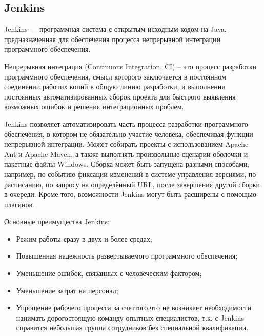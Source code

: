 \documentclass[a4paper]{article}
\begin{document}
    \subsection{Jenkins}
    Jenkins — программная система с открытым исходным кодом на Java, предназначенная для обеспечения процесса непрерывной интеграции программного обеспечения. \par
    Непрерывная интеграция (Continuous Integration, CI) – это процесс разработки программного обеспечения, смысл которого заключается в постоянном соединении рабочих копий в общую линию разработки, и выполнении постоянных автоматизированных сборок проекта для быстрого выявления возможных ошибок и решения интеграционных проблем. \par
    Jenkins позволяет автоматизировать часть процесса разработки программного обеспечения, в котором не обязательно участие человека, обеспечивая функции непрерывной интеграции. Может собирать проекты с использованием Apache Ant и Apache Maven, а также выполнять произвольные сценарии оболочки и пакетные файлы Windows. Сборка может быть запущена разными способами, например, по событию фиксации изменений в системе управления версиями, по расписанию, по запросу на определённый URL, после завершения другой сборки в очереди. Кроме того, возможности Jenkins могут быть расширены с помощью плагинов. \par
    Основные преимущества Jenkins:
    \begin{itemize}
        \item Режим работы сразу в двух и более средах;
        \item Повышенная надежность развертываемого программного обеспечения;
        \item Уменьшение ошибок, связанных с человеческим фактором;
        \item Уменьшение затрат на персонал;
        \item Упрощение рабочего процесса за счеттого,что не возникает необходимости нанимать дорогостоящую команду опытных специалистов, т.к. с Jenkins справится небольшая группа сотрудников без специальной квалификации.
    \end{itemize}
\end{document}
